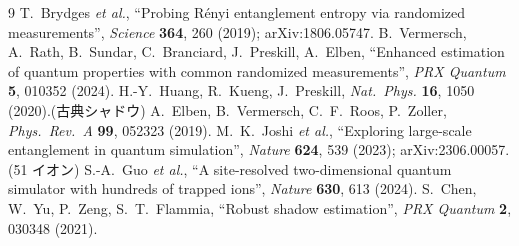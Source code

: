 \documentclass[10pt,a4paper,twocolumn]{ltjsarticle}
\begin{document}
{\footnotesize
\begin{thebibliography}{9}
\setlength{\itemsep}{0pt}
 T.~Brydges \textit{et al.}, ``Probing R\'enyi entanglement entropy via randomized measurements'',
\textit{Science} \textbf{364}, 260 (2019); arXiv:1806.05747.
 B.~Vermersch, A.~Rath, B.~Sundar, C.~Branciard, J.~Preskill, A.~Elben,
``Enhanced estimation of quantum properties with common randomized measurements'', \textit{PRX Quantum} \textbf{5}, 010352 (2024).
 H.-Y.~Huang, R.~Kueng, J.~Preskill, \textit{Nat.~Phys.} \textbf{16}, 1050 (2020).(古典シャドウ)
 A.~Elben, B.~Vermersch, C.~F.~Roos, P.~Zoller, \textit{Phys.~Rev.~A} \textbf{99}, 052323 (2019).
 M.~K.~Joshi \textit{et al.}, ``Exploring large-scale entanglement in quantum simulation'',
\textit{Nature} \textbf{624}, 539 (2023); arXiv:2306.00057.(51 イオン)
 S.-A.~Guo \textit{et al.}, ``A site-resolved two-dimensional quantum simulator with hundreds of trapped ions'',
\textit{Nature} \textbf{630}, 613 (2024).
 S.~Chen, W.~Yu, P.~Zeng, S.~T.~Flammia, ``Robust shadow estimation'', \textit{PRX Quantum} \textbf{2}, 030348 (2021).
\end{thebibliography}
}
\end{document}
